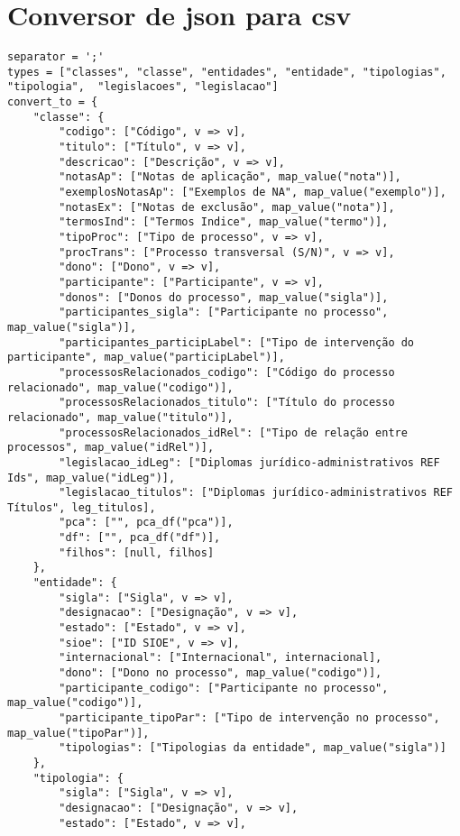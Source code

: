\section{Conversor de \acrshort{json} para \acrshort{csv}}\label{exem:convCSV}
\begin{lstlisting}[language=pseudocode, caption=Algoritmo de conversão de \acrshort{json} para \acrshort{csv}]
separator = ';'
types = ["classes", "classe", "entidades", "entidade", "tipologias", "tipologia",  "legislacoes", "legislacao"]
convert_to = {
    "classe": {
        "codigo": ["Código", v => v],
        "titulo": ["Título", v => v],
        "descricao": ["Descrição", v => v],
        "notasAp": ["Notas de aplicação", map_value("nota")],
        "exemplosNotasAp": ["Exemplos de NA", map_value("exemplo")],
        "notasEx": ["Notas de exclusão", map_value("nota")],
        "termosInd": ["Termos Indice", map_value("termo")],
        "tipoProc": ["Tipo de processo", v => v],
        "procTrans": ["Processo transversal (S/N)", v => v],
        "dono": ["Dono", v => v],
        "participante": ["Participante", v => v],
        "donos": ["Donos do processo", map_value("sigla")],
        "participantes_sigla": ["Participante no processo", map_value("sigla")],
        "participantes_participLabel": ["Tipo de intervenção do participante", map_value("participLabel")],
        "processosRelacionados_codigo": ["Código do processo relacionado", map_value("codigo")],
        "processosRelacionados_titulo": ["Título do processo relacionado", map_value("titulo")],
        "processosRelacionados_idRel": ["Tipo de relação entre processos", map_value("idRel")],
        "legislacao_idLeg": ["Diplomas jurídico-administrativos REF Ids", map_value("idLeg")],
        "legislacao_titulos": ["Diplomas jurídico-administrativos REF Títulos", leg_titulos],
        "pca": ["", pca_df("pca")],
        "df": ["", pca_df("df")],
        "filhos": [null, filhos]
    },
    "entidade": {
        "sigla": ["Sigla", v => v],
        "designacao": ["Designação", v => v],
        "estado": ["Estado", v => v],
        "sioe": ["ID SIOE", v => v],
        "internacional": ["Internacional", internacional],
        "dono": ["Dono no processo", map_value("codigo")],
        "participante_codigo": ["Participante no processo", map_value("codigo")],
        "participante_tipoPar": ["Tipo de intervenção no processo", map_value("tipoPar")],
        "tipologias": ["Tipologias da entidade", map_value("sigla")]
    },
    "tipologia": {
        "sigla": ["Sigla", v => v],
        "designacao": ["Designação", v => v],
        "estado": ["Estado", v => v],

\end{lstlisting}

